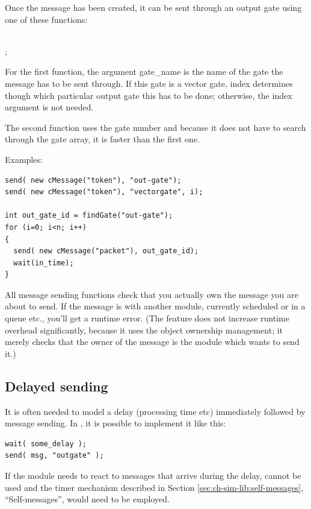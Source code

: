 Once the message has been created, it can be sent through an 
output gate using one of these functions:

\\
;



For the first function, the argument gate\_name is the name of 
the gate the message has to be sent through. If this gate is 
a vector gate, index determines though which particular output 
gate this has to be done; otherwise, the index argument is not 
needed.

The second function uses the gate number and because it does 
not have to search through the gate array, it is faster than 
the first one.


Examples:

\begin{Verbatim}
send( new cMessage("token"), "out-gate");
send( new cMessage("token"), "vectorgate", i);

int out_gate_id = findGate("out-gate");
for (i=0; i<n; i++)
{
  send( new cMessage("packet"), out_gate_id);
  wait(in_time);
}
\end{Verbatim}


All message sending functions check that you actually own the message
you are about to send. If the message is with another module,
currently scheduled or in a queue etc., you'll get a runtime error.
(The feature does not increase runtime overhead significantly, because
it uses the object ownership management;
it merely checks that the owner of the message is the module which
wants to send it.)





\subsection{Delayed sending}

It is often needed to model a delay (processing time etc) immediately 
followed by message sending. In {\opp}, it is possible to implement 
it like this:

\begin{Verbatim}
wait( some_delay );
send( msg, "outgate" );
\end{Verbatim}


If the module needs to react to messages that arrive during the delay,
 cannot be used and the timer mechanism described in
Section \ref{sec:ch-sim-lib:self-messages}, ``Self-messages'', would
need to be employed.


